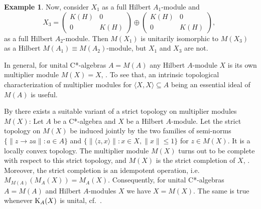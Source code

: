 \documentclass{amsart}
\theoremstyle{definition}
\newtheorem{ex}[thm]{Example}
\begin{document}
\begin{ex}
Now, consider $X_1$ as a full Hilbert $A_1$-module and
\[
   X_3 =  \left(  \begin{array}{cc}  K(H) & 0 \\ 0 & K(H) \end{array} \right) \oplus \left(  \begin{array}{cc}  K(H) & 0 \\ 0 & K(H) \end{array} \right), \,\,
\]
as a full Hilbert $A_2$-module. Then $M(X_1)$ is unitarily isomorphic to $M(X_3)$ as a Hilbert $M(A_1) \equiv M(A_2)$-module, but $X_1$ and $X_3$ are not. 
\end{ex}

In general, for unital C*-algebras $A=M(A)$ any Hilbert $A$-module $X$ is its own multiplier module $M(X)=X$, \cite[Remark 1.11]{BG_2004}. To see that, an intrinsic topological characterization of multiplier modules for $\langle X,X \rangle \subseteq A$ being an essential ideal of $M(A)$  is useful. 

By \cite{BG_2004} there exists a suitable variant of a strict topology on multiplier modules $M(X)$: Let $A$ be a C*-algebra and $X$ be a Hilbert $A$-module.  Let the strict topology on $M(X)$ be induced jointly by the two families of semi-norms $\{\| z \to za \|: a \in A \}$ and $\{ \| \langle z,x \rangle \|: x \in X, \|x\| \leq 1 \}$ for $z \in M(X)$. It is a locally convex topology. The multiplier module $M(X)$ turns out to be complete with respect to this strict topology, and $M(X)$ is the strict completion of $X$, \cite[Thm.~1.8, 1.9]{BG_2004}. Moreover, the strict completion is an idempotent operation, i.e.~$M_{M(A)}(M_A(X))=M_A(X)$. Consequently, for unital C*-algebras $A=M(A)$ and Hilbert $A$-modules $X$ we have $X=M(X)$. The same is true whenever ${\rm K}_A(X)$ is unital, cf.~\cite[Cor.~2.9]{BG_2004}. 
\end{document}
